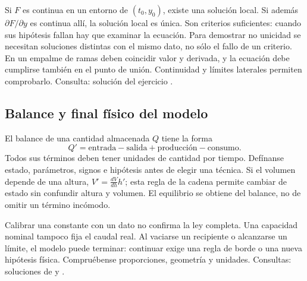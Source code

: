 Si $F$ es continua en un entorno de $(t_0,y_0)$, existe una solución local.
Si además $\partial F/\partial y$ es continua allí, la solución local es
única. Son criterios suficientes: cuando sus hipótesis fallan hay que
examinar la ecuación. Para demostrar no unicidad se necesitan soluciones
distintas con el mismo dato, no sólo el fallo de un criterio. En un empalme
de ramas deben coincidir valor y derivada, y la ecuación debe cumplirse
también en el punto de unión. Continuidad y límites laterales permiten
comprobarlo. Consulta: solución del ejercicio .

%
\subsection*{Balance y final físico del modelo}
\label{CH01-B04}
El balance de una cantidad almacenada $Q$ tiene la forma
\[
 Q'=\text{entrada}-\text{salida}+\text{producción}-\text{consumo}.
\]
Todos sus términos deben tener unidades de cantidad por tiempo. Defínanse
estado, parámetros, signos e hipótesis antes de elegir una técnica.
Si el volumen depende de una altura, $V'=\frac{dV}{dh}h'$; esta regla de
la cadena permite cambiar de estado sin confundir altura y volumen.
El equilibrio se obtiene del balance, no de omitir un término incómodo.

Calibrar una constante con un dato no confirma la ley completa. Una
capacidad nominal tampoco fija el caudal real. Al vaciarse un recipiente o
alcanzarse un límite, el modelo puede terminar: continuar exige una regla
de borde o una nueva hipótesis física. Compruébense proporciones, geometría
y unidades. Consultas: soluciones de  y .
